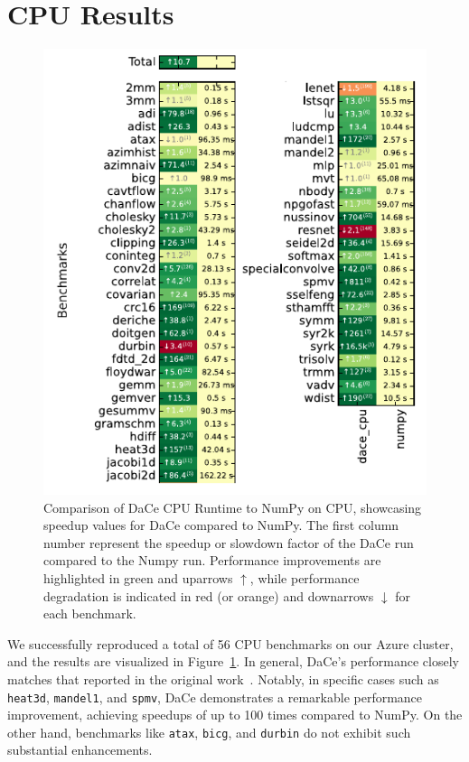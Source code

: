 \section{CPU Results}
\label{sec:MAPS}

\begin{figure}[tp]
    \centering
    \includegraphics[width=.45\textwidth]{imgs/figure_cpu_crop.pdf}
    \caption{Comparison of DaCe CPU Runtime to NumPy on CPU, showcasing speedup values for DaCe compared to NumPy. The first column number represent the speedup or slowdown factor of the DaCe run compared to the Numpy run. Performance improvements are highlighted in green and uparrows $\uparrow$, while performance degradation is indicated in red (or orange) and downarrows $\downarrow$ for each benchmark.}
    \label{fig:heatmap_cpu}
\end{figure}

We successfully reproduced a total of 56 CPU benchmarks on our Azure cluster, and the results are visualized in Figure~\ref{fig:heatmap_cpu}. In general, DaCe's performance closely matches that reported in the original work~\cite{dace2021}. Notably, in specific cases such as \texttt{heat3d}, \texttt{mandel1}, and \texttt{spmv}, DaCe demonstrates a remarkable performance improvement, achieving speedups of up to 100 times compared to NumPy. On the other hand, benchmarks like \texttt{atax}, \texttt{bicg}, and \texttt{durbin} do not exhibit such substantial enhancements.

